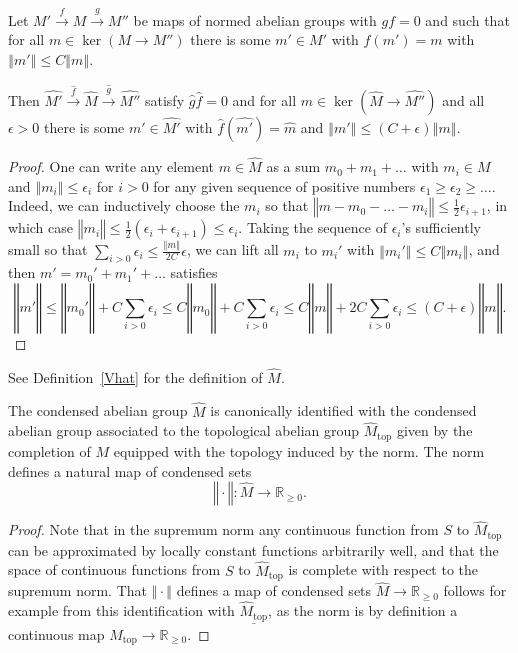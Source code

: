 \begin{proposition}
  \label{prop:completeexact}
Let $M'\xrightarrow{f} M\xrightarrow{g} M''$ be maps of normed abelian groups with $gf=0$ and such that for all $m\in \ker(M\to M'')$ there is some $m'\in M'$ with $f(m')=m$ with $‖m'‖\leq C‖m‖$.

Then $\widehat{M'}\xrightarrow{\widehat{f}} \widehat{M}\xrightarrow{\widehat{g}} \widehat{M''}$ satisfy $\widehat{g}\widehat{f}=0$ and for all $m\in \ker(\widehat{M}\to \widehat{M''})$ and all $\epsilon>0$ there is some $m'\in \widehat{M'}$ with $\widehat{f}(\widehat{m'})=\widehat{m}$ and $‖m'‖\leq (C+\epsilon)‖m‖$.
\end{proposition}

\begin{proof} One can write any element $m\in \widehat{M}$ as a sum $m_0+m_1+\ldots$ with $m_i\in M$ and $‖m_i‖\leq \epsilon_i$ for $i>0$ for any given sequence of positive numbers $\epsilon_1\geq \epsilon_2\geq \ldots$. Indeed, we can inductively choose the $m_i$ so that $‖m-m_0-\ldots-m_i‖\leq \tfrac 12 \epsilon_{i+1}$, in which case $‖m_i‖\leq \tfrac 12(\epsilon_i+\epsilon_{i+1})\leq \epsilon_i$. Taking the sequence of $\epsilon_i$'s sufficiently small so that $\sum_{i>0} \epsilon_i\leq \tfrac {‖m‖}{2C} \epsilon$, we can lift all $m_i$ to $m_i'$ with $‖m_i'‖\leq C‖m_i‖$, and then $m'=m_0'+m_1'+\ldots$ satisfies
\[
‖m'‖\leq ‖m_0'‖+C\sum_{i>0} \epsilon_i\leq C‖m_0‖+C\sum_{i>0} \epsilon_i\leq C‖m‖+2C\sum_{i>0} \epsilon_i\leq (C+\epsilon)‖m‖.
\]
\end{proof}

See Definition~\ref{Vhat} for the definition of $\widehat{M}$.

\begin{proposition}
  \label{prop:normedcompletion}
The condensed abelian group $\widehat{M}$ is canonically identified with the condensed abelian group associated to the topological abelian group $\widehat{M}_{\mathrm{top}}$ given by the completion of $M$ equipped with the topology induced by the norm. The norm defines a natural map of condensed sets
\[
‖\cdot‖: \widehat{M}\to \mathbb R_{\geq 0}.
\]
\end{proposition}

\begin{proof}
Note that in the supremum norm any continuous function from $S$ to $\widehat{M}_{\mathrm{top}}$ can be approximated by locally constant functions arbitrarily well, and that the space of continuous functions from $S$ to $\widehat{M}_{\mathrm{top}}$ is complete with respect to the supremum norm. That $‖\cdot‖$ defines a map of condensed sets $\widehat{M}\to \mathbb R_{\geq 0}$ follows for example from this identification with $\underline{\widehat{M}_{\mathrm{top}}}$, as the norm is by definition a continuous map $\widehat{M}_{\mathrm{top}}\to \mathbb R_{\geq 0}$.
\end{proof}

